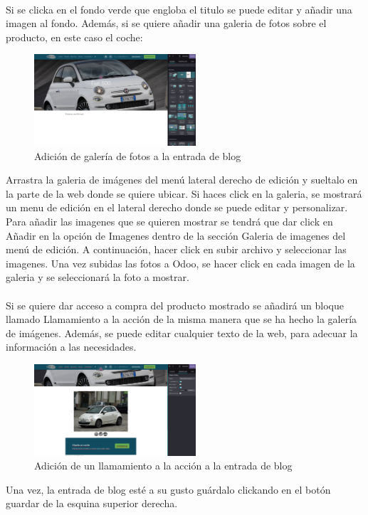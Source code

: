 \documentclass[paper=a4wide, fontsize=11pt]{report}	 %
\begin{document}
\paragraph{}
Si se clicka en el fondo verde que engloba el titulo se puede editar y añadir una imagen al fondo. Además, si se quiere añadir una galeria de fotos sobre el producto, en este caso el coche:
\begin{figure}[h]
    \centering
    \includegraphics[width=6cm]{galeria.png}
    \caption{Adición de galería de fotos a la entrada de blog}
    \label{fig:galeria}
\end{figure}
Arrastra la galeria de imágenes del menú lateral derecho de edición y sueltalo en la parte de la web donde se quiere ubicar. Si haces click en la galeria, se mostrará un menu de edición en el lateral derecho donde se puede editar y personalizar. Para añadir las imagenes que se quieren mostrar se tendrá que dar click en Añadir en la opción de Imagenes dentro de la sección Galeria de imagenes del menú de edición. A continuación, hacer click en subir archivo y seleccionar las imagenes. Una vez subidas las fotos a Odoo, se hacer click en cada imagen de la galeria y se seleccionará la foto a mostrar. 
\paragraph{}
Si se quiere dar acceso a compra del producto mostrado se añadirá un bloque llamado Llamamiento a la acción de la misma manera que se ha hecho la galería de imágenes. Además, se puede editar cualquier texto de la web, para adecuar la información a las necesidades.
\begin{figure}[h]
    \centering
    \includegraphics[width=6cm]{callToAction.png}
    \caption{Adición de un llamamiento a la acción a la entrada de blog}
    \label{fig:callToAction}
\end{figure}
Una vez, la entrada de blog esté a su gusto guárdalo clickando en el botón guardar de la esquina superior derecha.
\end{document}
